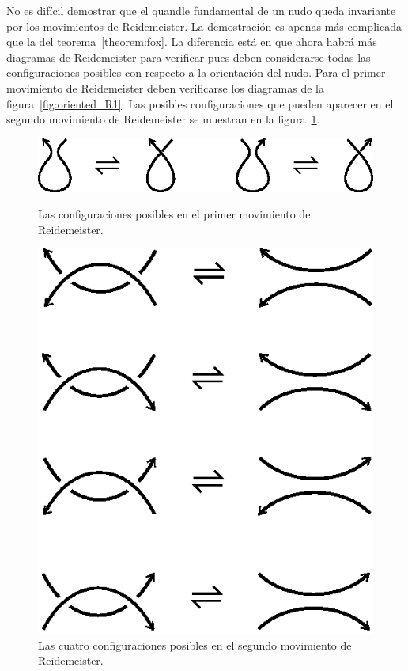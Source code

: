 \documentclass[graybox]{svmult}
\begin{document}
	\label{block:quandle_proof} No es difícil demostrar que el quandle
	fundamental de un nudo queda invariante por los movimientos de
	Reidemeister. La demostración es apenas más complicada que la del
	teorema~\ref{theorem:fox}. La diferencia está en que ahora habrá más diagramas
	de Reidemeister para verificar pues deben considerarse todas las
	configuraciones posibles con respecto a la orientación del nudo. 
    Para el primer movimiento de Reidemeister deben verificarse los diagramas de
    la figura~\ref{fig:oriented_R1}.
    Las posibles configuraciones que pueden aparecer en el segundo movimiento de
    Reidemeister se muestran en la figura~\ref{fig:oriented_R2}. 

    \begin{figure}[ht]
		\begin{minipage}{0.5\textwidth}
		\centering
        \includegraphics[scale=0.6]{images/oriented_R1}
        \caption{Las configuraciones posibles en el primer movimiento de Reidemeister.}
        \label{fig:oriented_R1}
    \end{minipage}
	\begin{minipage}{0.5\textwidth}
		\centering
        \includegraphics[scale=0.6]{images/oriented_R2}
        \caption{Las cuatro configuraciones posibles en el segundo movimiento de Reidemeister.}
        \label{fig:oriented_R2}
    \end{minipage}
    \end{figure}
\end{document}

